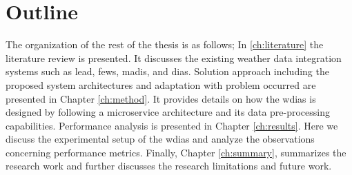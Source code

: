 \section{Outline}
The organization of the rest of the thesis is as follows; In \cref{ch:literature} the literature review is presented. It discusses the existing weather data integration systems such as \acrshort{lead}, \acrshort{fews}, \acrshort{madis}, and \acrshort{dias}. Solution approach including the proposed system architectures and adaptation with problem occurred are presented in Chapter \ref{ch:method}. It provides details on how the \acrshort{wdias} is designed by following a microservice architecture and its data pre-processing capabilities. Performance analysis is presented in Chapter \ref{ch:results}. Here we discuss the experimental setup of the \acrshort{wdias} and analyze the observations concerning performance metrics. Finally, Chapter \ref{ch:summary}, summarizes the research work and further discusses the research limitations and future work.
